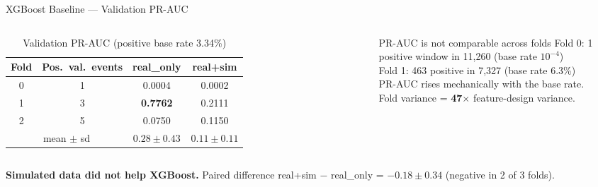 \documentclass[aspectratio=169,10pt]{beamer}
\begin{document}
\begin{frame}{XGBoost Baseline — Validation PR-AUC}
  \begin{columns}
      \begin{table}
        \caption{Validation PR-AUC (positive base rate 3.34\%)}
        \begin{tabular}{cccc}
          \toprule
          Fold & Pos.~val.~events & real\_only & real+sim \\
          \midrule
          0 & 1 & 0.0004 & 0.0002 \\
          1 & 3 & \textbf{0.7762} & 0.2111 \\
          2 & 5 & 0.0750 & 0.1150 \\
          \midrule
          \multicolumn{2}{c}{mean $\pm$ sd} & $0.28 \pm 0.43$ & $0.11 \pm 0.11$ \\
          \bottomrule
        \end{tabular}
      \end{table}
      \begin{alertblock}{PR-AUC is not comparable across folds}
        Fold 0: 1 positive window in 11,260 (base rate $10^{-4}$)\\
        Fold 1: 463 positive in 7,327 (base rate 6.3\%)\\
        PR-AUC rises mechanically with the base rate.\\
        Fold variance = \textbf{47$\times$} feature-design variance.
      \end{alertblock}
  \end{columns}
  \vspace{0.4em}
  \textbf{Simulated data did not help XGBoost.} Paired difference real+sim $-$ real\_only = $-0.18 \pm 0.34$ (negative in 2 of 3 folds).
\end{frame}
\end{document}
